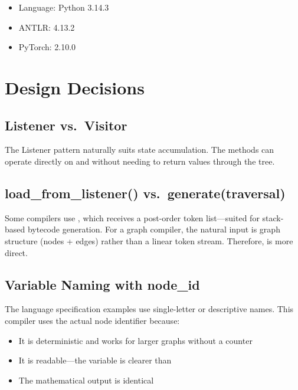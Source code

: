 \documentclass{nngraph-en}
\begin{document}
\begin{itemize}[noitemsep]
    \item Language: Python 3.14.3
    \item ANTLR: 4.13.2
    \item PyTorch: 2.10.0
\end{itemize}

\chapter{Design Decisions}

\section{Listener vs.\ Visitor}

The Listener pattern naturally suits state accumulation. The
 methods can operate directly on 
and  without needing to return values through the
tree.

\section{load\_from\_listener() vs.\ generate(traversal)}

Some compilers use
, which receives a
post-order token list---suited for stack-based bytecode generation.
For a graph compiler, the natural input is graph structure
(nodes + edges) rather than a linear token stream. Therefore,
 is more direct.

\section{Variable Naming with node\_id}

The language specification examples use single-letter or descriptive
names. This compiler uses the actual node identifier because:
\begin{itemize}[noitemsep]
    \item It is deterministic and works for larger graphs without
    a counter
    \item It is readable---the variable  is clearer
    than 
    \item The mathematical output is identical
\end{itemize}
\end{document}
